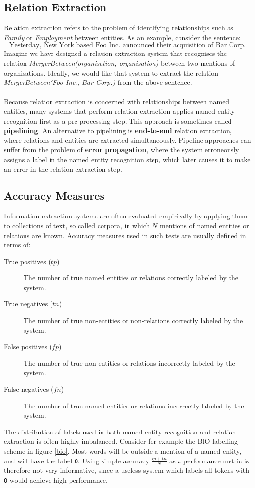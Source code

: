 \subsection{Relation Extraction}
\label{relation_extract}
Relation extraction refers to the problem of identifying relationships such as \textit{Family} or \textit{Employment} between entities. As an example, consider the sentence: 
$$
\text{Yesterday, New York based Foo Inc. announced their acquisition of Bar Corp.}
$$ 
Imagine we have designed a relation extraction system that recognises the relation \textit{MergerBetween(organisation, organisation)} between two mentions of organisations. Ideally, we would like that system to extract the relation \textit{MergerBetween(Foo Inc., Bar Corp.)} from the above sentence.
\\\\
Because relation extraction is concerned with relationships between named entities, many systems that perform relation extraction applies named entity recognition first as a pre-processing step. This approach is sometimes called \textbf{pipelining}. An alternative to pipelining is \textbf{end-to-end} relation extraction, where relations and entities are extracted simultaneously. Pipeline approaches can suffer from the problem of \textbf{error propagation}, where the system erroneously assigns a label in the named entity recognition step, which later causes it to make an error in the relation extraction step.

\subsection{Accuracy Measures}
Information extraction systems are often evaluated empirically by applying them to collections of text, so called corpora, in which $N$ mentions of named entities or relations are known. Accuracy measures used in such tests are usually defined in terms of:
\begin{description}
	\item [True positives ($tp$)] The number of true named entities or relations correctly labeled by the system.
	\item [True negatives ($tn$)] The number of true non-entities or non-relations correctly labeled by the system.
	\item [False positives ($fp$)] The number of true non-entities or relations incorrectly labeled by the system.
	\item [False negatives ($fn$)] The number of true named entities or relations incorrectly labeled by the system.
\end{description}
The distribution of labels used in both named entity recognition and relation extraction is often highly imbalanced. Consider for example the BIO labelling scheme in figure \ref{bio}. Most words will be outside a mention of a named entity, and will have the label \texttt{O}. Using simple accuracy $\frac{tp + tn}{N}$ as a performance metric is therefore not very informative, since a useless system which labels all tokens with \texttt{O} would achieve high performance.

